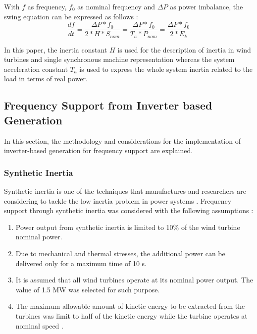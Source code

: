 With $f$ as frequency, $f_0$ as nominal frequency and $\Delta P$ as power imbalance, the swing equation can be expressed as follows \cite{kundur1994power}:
\begin{equation}
\label{eq:swing}
\frac{df}{dt}=\dfrac{\Delta P*f_0}{2*H*S_{nom}}=\frac{\Delta P*f_0}{T_a*P_{nom}}=\frac{\Delta P*f_0}{2*E_k}
\end{equation}

In this paper, the inertia constant $ H $ is used for the description of inertia in wind turbines and single synchronous machine representation whereas the system acceleration constant $ T_a $ is used to express the whole system inertia related to the load in terms of real power.

\subsection{Frequency Support from Inverter based Generation}

In this section, the methodology and considerations for the implementation of inverter-based generation for frequency support are explained.

\subsubsection{Synthetic Inertia}

Synthetic inertia is one of the techniques that manufactures and researchers are considering to tackle the low inertia problem in power systems \cite{Gevorgian.2017, GeneralElectricInternational.2013}. Frequency support through synthetic inertia was considered with the following assumptions \cite{dreidy2017inertia, nesje2015need}:
\begin{enumerate}[leftmargin=*,labelsep=4.9mm]
	\item Power output from synthetic inertia is limited to 10\% of the wind turbine nominal power.
	\item Due to mechanical and thermal stresses, the additional power can be delivered only for a maximum time of 10 s.
	\item It is assumed that all wind turbines operate at its nominal power output. The value of 1.5 MW was selected for such purpose.
	\item The maximum allowable amount of kinetic energy to be extracted from the turbines was limit to half of the kinetic energy while the turbine operates at nominal speed \cite{NREL.2012}.
	
\end{enumerate}

